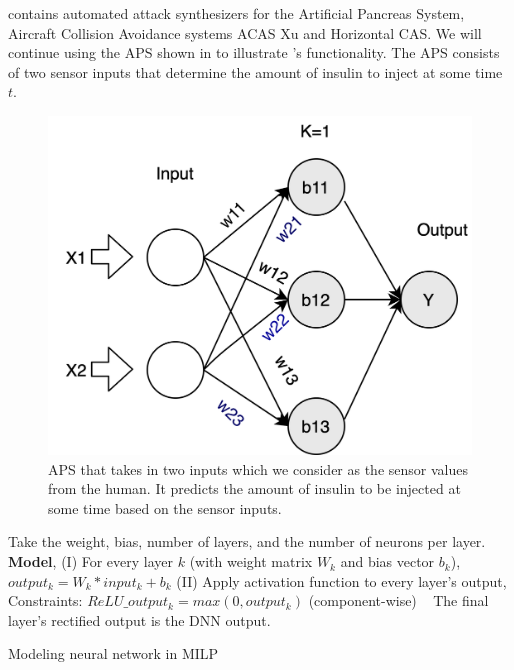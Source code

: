  \tool contains automated attack synthesizers for the Artificial Pancreas System, Aircraft Collision Avoidance systems ACAS Xu and Horizontal CAS. 
 We will continue using the \ac{APS} shown in \label{fig:toyaps} to illustrate \tool's functionality. 
The \ac{APS} consists of two sensor inputs that determine the amount of insulin to inject at some time $t$. 
\begin{figure}
	\centering
	\includegraphics[width=0.7\linewidth]{Images/ToyAPS}
	\caption[APS]{APS that takes in two inputs which we consider as the sensor values from the human. It predicts the amount of insulin to be injected at some time based on the sensor inputs.}
	\label{fig:toyaps}
\end{figure}


\begin{algorithm}
	Take the weight, bias, number of layers, and the number of neurons per layer. \\
	
	\textbf{Model}, \linebreak
	(I) For every layer $k$ (with weight matrix $W_k$ and bias vector $b_k$), $output_k = W_k * input_k + b_k$
	\linebreak
	(II) Apply activation function to every layer's output,
	\linebreak
	Constraints: $ReLU\_output_k = max(0, output_k)$ (component-wise) \
	\linebreak
	The final layer's rectified output is the DNN output.
	
	\caption{Modeling neural network in MILP}
	\label{algo:b}
\end{algorithm}


